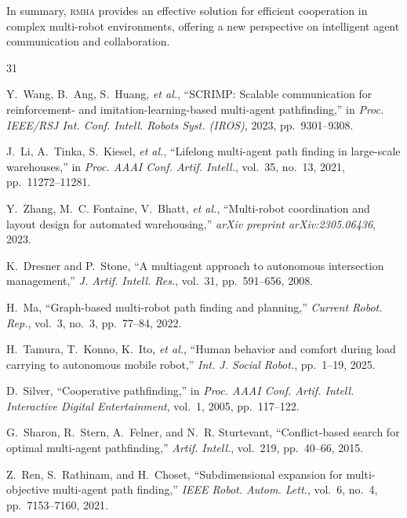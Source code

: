 \documentclass[conference]{IEEEtran}
\newcommand{\etal}{\textit{et al.}}
\newcommand{\rmha}{\textsc{rmha}}
\begin{document}
In summary, \rmha{} provides an effective solution for efficient
cooperation in complex multi-robot environments, offering a new
perspective on intelligent agent communication and collaboration.


\begin{thebibliography}{31}

Y.~Wang, B.~Ang, S.~Huang, \etal,
``SCRIMP: Scalable communication for reinforcement- and
imitation-learning-based multi-agent pathfinding,''
in \emph{Proc. IEEE/RSJ Int. Conf. Intell. Robots Syst. (IROS)},
2023, pp.~9301--9308.

J.~Li, A.~Tinka, S.~Kiesel, \etal,
``Lifelong multi-agent path finding in large-scale warehouses,''
in \emph{Proc. AAAI Conf. Artif. Intell.}, vol.~35, no.~13,
2021, pp.~11272--11281.

Y.~Zhang, M.~C. Fontaine, V.~Bhatt, \etal,
``Multi-robot coordination and layout design for automated
warehousing,''
\emph{arXiv preprint arXiv:2305.06436}, 2023.

K.~Dresner and P.~Stone,
``A multiagent approach to autonomous intersection management,''
\emph{J. Artif. Intell. Res.}, vol.~31, pp.~591--656, 2008.

H.~Ma,
``Graph-based multi-robot path finding and planning,''
\emph{Current Robot. Rep.}, vol.~3, no.~3, pp.~77--84, 2022.

H.~Tamura, T.~Konno, K.~Ito, \etal,
``Human behavior and comfort during load carrying to autonomous
mobile robot,''
\emph{Int. J. Social Robot.}, pp.~1--19, 2025.

D.~Silver,
``Cooperative pathfinding,''
in \emph{Proc. AAAI Conf. Artif. Intell. Interactive Digital
Entertainment}, vol.~1, 2005, pp.~117--122.

G.~Sharon, R.~Stern, A.~Felner, and N.~R. Sturtevant,
``Conflict-based search for optimal multi-agent pathfinding,''
\emph{Artif. Intell.}, vol.~219, pp.~40--66, 2015.

Z.~Ren, S.~Rathinam, and H.~Choset,
``Subdimensional expansion for multi-objective multi-agent path
finding,''
\emph{IEEE Robot. Autom. Lett.}, vol.~6, no.~4,
pp.~7153--7160, 2021.


\end{thebibliography}
\end{document}
